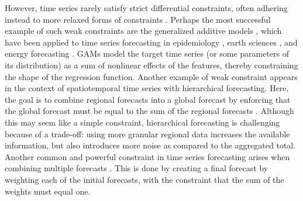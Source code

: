 However, time series rarely satisfy strict differential constraints, often adhering instead to more relaxed forms of constraints \citep[][]{coletta2023on}.
Perhaps the most successful example of such weak constraints are the generalized additive models \citep[GAMs,][]{hastie1986generalized}, which have been applied to time series forecasting in epidemiology \citep{wood2017generalized}, earth sciences \citep{augusting2009modeling}, and energy forecasting \citep{fasiolo2021fast}. 
GAMs model the target time series (or some parameters of its distribution) as a sum of nonlinear effects of the features, thereby constraining the shape of the regression function.
Another example of weak constraint appears in the context of spatiotemporal time series with hierarchical forecasting. Here, the goal is to combine regional forecasts into a global forecast by enforcing that the global forecast must be equal to the sum of the regional forecasts \citep{Wickramasuriya2019optimal}.
Although this may seem like a simple constraint, hierarchical forecasting is challenging because of a trade-off: using more granular regional data increases the available information, but also introduces more noise as compared to the aggregated total. Another common and powerful constraint in time series forecasting arises when combining multiple forecasts \citep{gaillard2014second}. 
This is done by creating a final forecast by weighting each of the initial forecasts, with the constraint that the sum of the weights must equal one.

